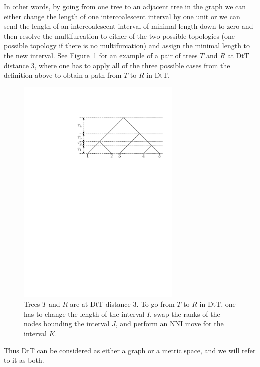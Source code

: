 \documentclass{amsart}
\newcommand{\dts}{\mathrm{DtT}}
\begin{document}
In other words, by going from one tree to an adjacent tree in the graph we can either change the length of one intercoalescent interval by one unit or we can send the length of an intercoalescent interval of minimal length down to zero and then resolve the multifurcation to either of the two possible topologies (one possible topology if there is no multifurcation) and assign the minimal length to the new interval.
See Figure~\ref{dts_neighbours.pdf}  for an example of a pair of trees $T$ and $R$ at $\dts$ distance $3$, where one has to apply all of the three possible cases from the definition above to obtain a path from $T$ to $R$ in $\dts$.

\begin{figure}
\centering
\includegraphics[width=0.7\textwidth]{T5.pdf}
\caption{Trees $T$ and $R$ are at $\dts$ distance $3$.
To go from $T$ to $R$ in $\dts$, one has to change the length of the interval $I$, swap the ranks of the nodes bounding the interval $J$, and perform an NNI move for the interval $K$.}
\label{dts_neighbours.pdf}
\end{figure}

Thus $\dts$ can be considered as either a graph or a metric space, and we will refer to it as both.
\end{document}
